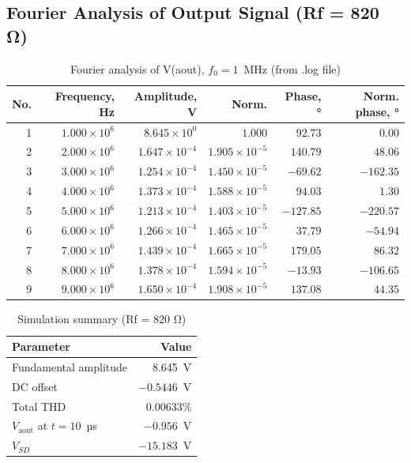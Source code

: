 \documentclass[a4paper, 12pt]{article}
\begin{document}
\subsection{Fourier Analysis of Output Signal (Rf = 820 Ω)}
\label{sec:fourier820}

\begin{table}[H]
\centering
\caption{Fourier analysis of V(aout), \(f_0 = 1\)~MHz (from .log file)}
\label{tab:fourier}
\begin{tabular}{@{}rrrrrr@{}}
\toprule
\textbf{No.} &
\textbf{Frequency, Hz} &
\textbf{Amplitude, V} &
\textbf{Norm.} &
\textbf{Phase, °} &
\textbf{Norm. phase, °} \\
\midrule
1 & \(1.000\times10^6\) & \(8.645\times10^0\) & \(1.000\) & \(92.73\) & \(0.00\) \\
2 & \(2.000\times10^6\) & \(1.647\times10^{-4}\) & \(1.905\times10^{-5}\) & \(140.79\) & \(48.06\) \\
3 & \(3.000\times10^6\) & \(1.254\times10^{-4}\) & \(1.450\times10^{-5}\) & \(-69.62\) & \(-162.35\) \\
4 & \(4.000\times10^6\) & \(1.373\times10^{-4}\) & \(1.588\times10^{-5}\) & \(94.03\) & \(1.30\) \\
5 & \(5.000\times10^6\) & \(1.213\times10^{-4}\) & \(1.403\times10^{-5}\) & \(-127.85\) & \(-220.57\) \\
6 & \(6.000\times10^6\) & \(1.266\times10^{-4}\) & \(1.465\times10^{-5}\) & \(37.79\) & \(-54.94\) \\
7 & \(7.000\times10^6\) & \(1.439\times10^{-4}\) & \(1.665\times10^{-5}\) & \(179.05\) & \(86.32\) \\
8 & \(8.000\times10^6\) & \(1.378\times10^{-4}\) & \(1.594\times10^{-5}\) & \(-13.93\) & \(-106.65\) \\
9 & \(9.000\times10^6\) & \(1.650\times10^{-4}\) & \(1.908\times10^{-5}\) & \(137.08\) & \(44.35\) \\
\bottomrule
\end{tabular}
\end{table}

\begin{table}[H]
\centering
\caption{Simulation summary (Rf = 820 Ω)}
\label{tab:summary}
\begin{tabular}{@{}lr@{}}
\toprule
\textbf{Parameter} & \textbf{Value} \\
\midrule
Fundamental amplitude       & 8.645~V \\
DC offset                  & \(-0.5446\)~V \\
Total THD                    & 0.00633\% \\
\(V_{\text{aout}}\) at \(t=10\)~µs & \(-0.956\)~V \\
\(V_{SD}\)                      & \(-15.183\)~V \\
\bottomrule
\end{tabular}
\end{table}
\end{document}
